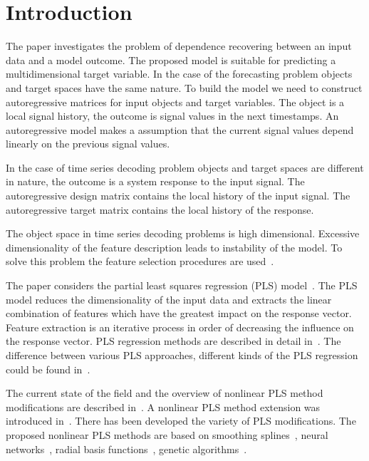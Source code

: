 \documentclass[runningheads]{llncs}
\begin{document}
\section{Introduction}

The paper investigates the problem of dependence recovering between an input data and a model outcome.
The proposed model is suitable for predicting a multidimensional target variable.
In the case of the forecasting problem objects and target spaces have the same nature.
To build the model we need to construct autoregressive matrices for input objects and target variables.
The object is a local signal history, the outcome is signal values in the next timestamps.
An autoregressive model makes a assumption that the current signal values depend linearly on the previous signal values.

In the case of time series decoding problem objects and target spaces are different in nature, the outcome is a system response to the input signal.
The autoregressive design matrix contains the local history of the input signal.
The autoregressive target matrix contains the local history of the response.

The object space in time series decoding problems is high dimensional.
Excessive dimensionality of the feature description leads to instability of the model.
To solve this problem the feature selection procedures are used~\cite{katrutsa2015qpfs,li2016feature}.

The paper considers the partial least squares regression (PLS) model~\cite{wegelin2000survey,abdi2003pls,geladi1986partial}.
The PLS model reduces the dimensionality of the input data and extracts the linear combination of features which have the greatest impact on the response vector.
Feature extraction is an iterative process in order of decreasing the influence on the response vector.
PLS regression methods are described in detail in~\cite{geladi1988pls, hoskuldsson1988plsr,de1993simpls}.
The difference between various PLS approaches, different kinds of the PLS regression could be found in~\cite{rosipal2006overview}.

The current state of the field and the overview of nonlinear PLS method modifications are described in~\cite{rosipal2011npls}.
A nonlinear PLS method extension was introduced in~\cite{wold1989nonlinear}.
There has been developed the variety of PLS modifications.
The proposed nonlinear PLS methods are based on smoothing splines~\cite{frank1990npls}, neural networks~\cite{qin1992npls}, radial basis functions~\cite{yan2003geneticpls}, genetic algorithms~\cite{hiden1998geneticpls}.
\end{document}
